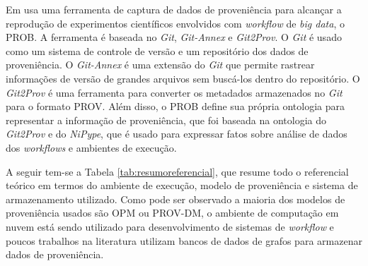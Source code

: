 Em \cite{korolev} usa uma ferramenta de captura de dados de proveniência para alcançar a reprodução de experimentos científicos envolvidos com \textit{workflow} de \textit{big data}, o PROB. A ferramenta é baseada no \textit{Git}, \textit{Git-Annex} e \textit{Git2Prov}. O \textit{Git} é usado como um sistema de controle de versão e um repositório dos dados de proveniência. O \textit{Git-Annex} é uma extensão do \textit{Git} que permite rastrear informações de versão de grandes arquivos sem buscá-los dentro do repositório. O \textit{Git2Prov} é uma ferramenta para converter os metadados armazenados no \textit{Git} para o formato PROV. Além disso, o PROB define sua própria ontologia para representar a informação de proveniência, que foi baseada na ontologia do \textit{Git2Prov} e do \textit{NiPype}, que é usado para expressar fatos sobre análise de dados dos \textit{workflows} e ambientes de execução.

A seguir tem-se a Tabela \ref{tab:resumoreferencial}, que resume todo o referencial teórico em termos do ambiente de execução, modelo de proveniência e sistema de armazenamento utilizado. Como pode ser observado a maioria dos modelos de proveniência usados são OPM ou PROV-DM, o ambiente de computação em nuvem está sendo utilizado para desenvolvimento de sistemas de \textit{workflow} e poucos trabalhos na literatura utilizam bancos de dados de grafos para armazenar dados de proveniência.

